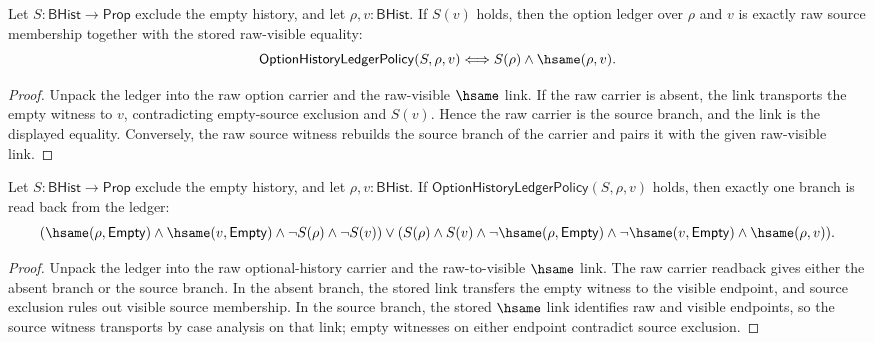 \begin{theorem}
\label{thm:option-history-ledger-policy-visible-source-exactness}
Let $S:\mathsf{BHist}\to\mathsf{Prop}$ exclude the empty history, and let
$\rho,v:\mathsf{BHist}$. If $S(v)$ holds, then the option ledger over
$\rho$ and $v$ is exactly raw source membership together with the stored
raw-visible equality:
$$
\mathsf{OptionHistoryLedgerPolicy}(S,\rho,v)
\Longleftrightarrow
S(\rho)\land\hsame(\rho,v).
$$
\end{theorem}
\begin{proof}
Unpack the ledger into the raw option carrier and the raw-visible $\hsame$
link. If the raw carrier is absent, the link transports the empty witness to
$v$, contradicting empty-source exclusion and $S(v)$. Hence the raw carrier is
the source branch, and the link is the displayed equality. Conversely, the raw
source witness rebuilds the source branch of the carrier and pairs it with the
given raw-visible link.
\end{proof}

\begin{theorem}
\label{thm:option-ledger-policy-exclusive-readback}
Let $S:\mathsf{BHist}\to\mathsf{Prop}$ exclude the empty history, and let
$\rho,v:\mathsf{BHist}$. If
$\mathsf{OptionHistoryLedgerPolicy}(S,\rho,v)$ holds, then exactly one branch is
read back from the ledger:
$$
(\hsame(\rho,\mathsf{Empty})\land \hsame(v,\mathsf{Empty})
\land \neg S(\rho)\land \neg S(v))
\lor
(S(\rho)\land S(v)\land \neg\hsame(\rho,\mathsf{Empty})
\land \neg\hsame(v,\mathsf{Empty})\land \hsame(\rho,v)).
$$
\end{theorem}
\begin{proof}
Unpack the ledger into the raw optional-history carrier and the raw-to-visible
$\hsame$ link. The raw carrier readback gives either the absent branch or the
source branch. In the absent branch, the stored link transfers the empty witness
to the visible endpoint, and source exclusion rules out visible source
membership. In the source branch, the stored $\hsame$ link identifies raw and
visible endpoints, so the source witness transports by case analysis on that
link; empty witnesses on either endpoint contradict source exclusion.
\end{proof}


